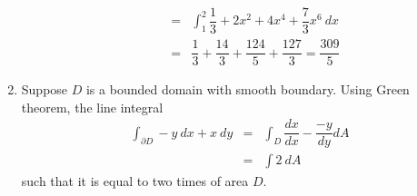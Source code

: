 \documentclass[a4paper,10pt]{article}
\begin{document}
\begin{enumerate}
\begin{itemize}
\begin{eqnarray}
		&=& \int_{1}^{2} \dfrac{1}{3} + 2x^2 + 4x^4 +\dfrac{7}{3}x^6 \ dx \\ \nonumber
		&=& \dfrac{1}{3} + \dfrac{14}{3} + \dfrac{124}{5} + \dfrac{127}{3} = \dfrac{309}{5}
		\end{eqnarray}
	\end{itemize}
	\item Suppose $ D $ is a bounded domain with smooth boundary. Using Green theorem, the line integral 
	\begin{eqnarray} \nonumber
	\int_{\partial D} -y \ dx + x \ dy &=& \int_{D} \dfrac{dx}{dx} - \dfrac{-y}{dy} dA \\ \nonumber
	&=& \int 2 \ dA
	\end{eqnarray}
	such that it is equal to two times of area $ D $.

\end{enumerate}
\end{document}
